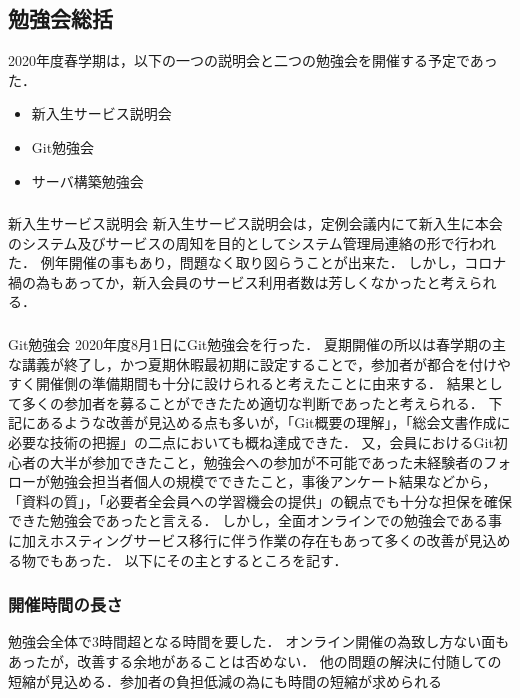 \subsection*{勉強会総括}


2020年度春学期は，以下の一つの説明会と二つの勉強会を開催する予定であった．

\begin{itemize}
  \item 新入生サービス説明会
  \item Git勉強会
  \item サーバ構築勉強会
\end{itemize}

\subsubsection*{}新入生サービス説明会
新入生サービス説明会は，定例会議内にて新入生に本会のシステム及びサービスの周知を目的としてシステム管理局連絡の形で行われた．
例年開催の事もあり，問題なく取り図らうことが出来た．
しかし，コロナ禍の為もあってか，新入会員のサービス利用者数は芳しくなかったと考えられる．

\subsubsection*{}Git勉強会
2020年度8月1日にGit勉強会を行った．
夏期開催の所以は春学期の主な講義が終了し，かつ夏期休暇最初期に設定することで，参加者が都合を付けやすく開催側の準備期間も十分に設けられると考えたことに由来する．
結果として多くの参加者を募ることができたため適切な判断であったと考えられる．
下記にあるような改善が見込める点も多いが，「Git概要の理解」，「総会文書作成に必要な技術の把握」の二点においても概ね達成できた．
又，会員におけるGit初心者の大半が参加できたこと，勉強会への参加が不可能であった未経験者のフォローが勉強会担当者個人の規模でできたこと，事後アンケート結果などから，「資料の質」，「必要者全会員への学習機会の提供」の観点でも十分な担保を確保できた勉強会であったと言える．
しかし，全面オンラインでの勉強会である事に加えホスティングサービス移行に伴う作業の存在もあって多くの改善が見込める物でもあった．
以下にその主とするところを記す．
\subsubsection*{開催時間の長さ}
勉強会全体で3時間超となる時間を要した．
オンライン開催の為致し方ない面もあったが，改善する余地があることは否めない．
他の問題の解決に付随しての短縮が見込める．参加者の負担低減の為にも時間の短縮が求められる
